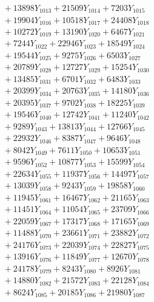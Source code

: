 \documentclass[a4paper,10pt]{article}
\begin{document}
{\begin{align}
&\;  + 13898 Y_{1013} + 21509 Y_{1014} + 7203 Y_{1015} \\[0.3ex]
&\;  + 19904 Y_{1016} + 10518 Y_{1017} + 24408 Y_{1018} \\[0.5ex]\allowbreak
&\;  + 10272 Y_{1019} + 13190 Y_{1020} + 6467 Y_{1021} \\[0.3ex]
&\;  + 7244 Y_{1022} + 22946 Y_{1023} + 18549 Y_{1024} \\[0.3ex]
&\;  + 19544 Y_{1025} + 9275 Y_{1026} + 6503 Y_{1027} \\[0.3ex]
&\;  + 20789 Y_{1028} + 12727 Y_{1029} + 15254 Y_{1030} \\[0.3ex]
&\;  + 13485 Y_{1031} + 6701 Y_{1032} + 6483 Y_{1033} \\[0.3ex]
&\;  + 20399 Y_{1034} + 20763 Y_{1035} + 14180 Y_{1036} \\[0.3ex]
&\;  + 20395 Y_{1037} + 9702 Y_{1038} + 18225 Y_{1039} \\[0.3ex]
&\;  + 19546 Y_{1040} + 12742 Y_{1041} + 11240 Y_{1042} \\[0.3ex]
&\;  + 9289 Y_{1043} + 13813 Y_{1044} + 12766 Y_{1045} \\[0.3ex]
&\;  + 22932 Y_{1046} + 8387 Y_{1047} + 9646 Y_{1048} \\[0.5ex]\allowbreak
&\;  + 8042 Y_{1049} + 7611 Y_{1050} + 10653 Y_{1051} \\[0.3ex]
&\;  + 9596 Y_{1052} + 10877 Y_{1053} + 15599 Y_{1054} \\[0.3ex]
&\;  + 22634 Y_{1055} + 11937 Y_{1056} + 14497 Y_{1057} \\[0.3ex]
&\;  + 13039 Y_{1058} + 9243 Y_{1059} + 19858 Y_{1060} \\[0.3ex]
&\;  + 11945 Y_{1061} + 16467 Y_{1062} + 21165 Y_{1063} \\[0.3ex]
&\;  + 11451 Y_{1064} + 11054 Y_{1065} + 23709 Y_{1066} \\[0.3ex]
&\;  + 22059 Y_{1067} + 17317 Y_{1068} + 17165 Y_{1069} \\[0.3ex]
&\;  + 11488 Y_{1070} + 23661 Y_{1071} + 23882 Y_{1072} \\[0.3ex]
&\;  + 24176 Y_{1073} + 22039 Y_{1074} + 22827 Y_{1075} \\[0.3ex]
&\;  + 13916 Y_{1076} + 11849 Y_{1077} + 12670 Y_{1078} \\[0.5ex]\allowbreak
&\;  + 24178 Y_{1079} + 8243 Y_{1080} + 8926 Y_{1081} \\[0.3ex]
&\;  + 14880 Y_{1082} + 21572 Y_{1083} + 22128 Y_{1084} \\[0.3ex]
&\;  + 8624 Y_{1085} + 20185 Y_{1086} + 21980 Y_{1087} \\[0.3ex]

\end{align}}
\end{document}
